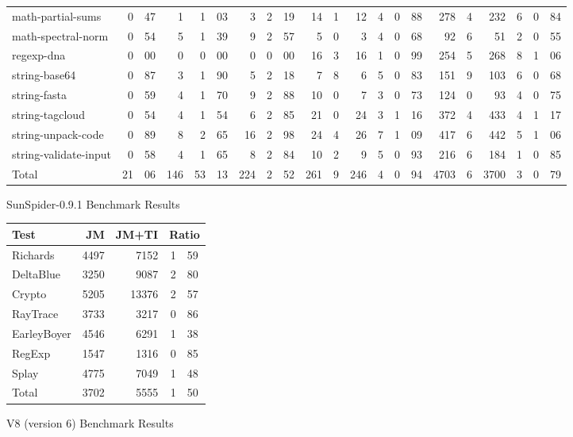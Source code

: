 \begin{figure*}
\begin{center}
\begin{tabular}{lr@{.}lrr@{.}lrr@{.}lr@{.}lr@{.}lr@{.}lr@{.}lr@{.}lr@{.}l}
math-partial-sums        & 0&47 & 1   & 1&03 & 3  & 2&19
    & 14&1 & 12&4 & 0&88  & 278&4 & 232&6 & 0&84 \\
math-spectral-norm       & 0&54 & 5   & 1&39 & 9  & 2&57
    & 5&0  & 3&4 & 0&68   & 92&6  & 51&2  & 0&55 \\
regexp-dna               & 0&00 & 0   & 0&00 & 0    & 0&00
    & 16&3 & 16&1 & 0&99  & 254&5 & 268&8 & 1&06 \\
string-base64            & 0&87 & 3   & 1&90 & 5   & 2&18
    & 7&8  & 6&5 & 0&83   & 151&9 & 103&6 & 0&68 \\
string-fasta             & 0&59 & 4   & 1&70 & 9   & 2&88
    & 10&0 & 7&3 & 0&73   & 124&0 & 93&4  & 0&75 \\
string-tagcloud          & 0&54 & 4   & 1&54 & 6  & 2&85
    & 21&0 & 24&3 & 1&16 & 372&4 & 433&4 & 1&17 \\
string-unpack-code       & 0&89 & 8   & 2&65 & 16 & 2&98
    & 24&4 & 26&7 & 1&09 & 417&6 & 442&5 & 1&06 \\
string-validate-input    & 0&58 & 4   & 1&65 & 8  & 2&84
    & 10&2 & 9&5 & 0&93   & 216&6 & 184&1 & 0&85 \\

\midrule

Total                  & 21&06 & 146 & 53&13 & 224 & 2&52
    & 261&9 & 246&4 & 0&94 & 4703&6 & 3700&3 & 0&79 \\

\bottomrule

\end{tabular}
\end{center}
\nocaptionrule \caption{SunSpider-0.9.1 Benchmark Results}
\label{fig:sunspider}
\end{figure*}

\begin{figure}
\begin{center}
\begin{tabular}{lrrr@{.}l}
\toprule
Test & JM & JM+TI & \multicolumn{2}{c}{Ratio} \\
\midrule
Richards & 4497 & 7152 & 1&59 \\
DeltaBlue & 3250 & 9087 & 2&80 \\
Crypto & 5205 & 13376 & 2&57 \\
RayTrace & 3733 & 3217 & 0&86 \\
EarleyBoyer & 4546 & 6291 & 1&38 \\
RegExp & 1547 & 1316 & 0&85 \\
Splay & 4775 & 7049 & 1&48 \\
\midrule
Total & 3702 & 5555 & 1&50 \\
\bottomrule
\end{tabular}
\end{center}
\nocaptionrule \caption{V8 (version 6) Benchmark Results}
\label{fig:v8bench}
\end{figure}

